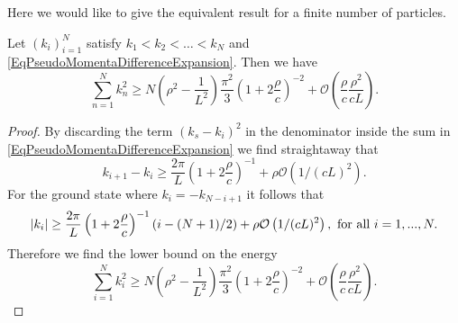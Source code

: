 Here we would like to give the equivalent result for a finite number of particles.
\begin{lemma}
	Let $ (k_i)_{i=1}^{N} $ satisfy $ k_1<k_2<\ldots<k_N $ and \eqref{EqPseudoMomentaDifferenceExpansion}. Then we have 
	\begin{equation}
	\sum_{n=1}^{N}k_n^2\geq N\left(\rho^2-\frac{1}{L^2}\right)\frac{\pi^2}{3}\left(1+2\frac{\rho}{c}\right)^{-2}+\mathcal{O}\left(\frac{\rho}{c}\frac{\rho^2}{cL} \right).
	\end{equation}
\end{lemma}
\begin{proof}
	By discarding the term $ (k_s-k_i)^2 $ in the denominator inside the sum in \eqref{EqPseudoMomentaDifferenceExpansion} we find straightaway that
	$$k_{i+1}-k_i\geq \frac{2\pi}{L}\left(1+2\frac{\rho}{c}\right)^{-1}+\rho \mathcal{O}\left(1/(cL)^2\right). $$
For the ground state where $k_i=-k_{N-i+1}$ it follows that \begin{equation}
	\left\lvert k_i \right\rvert\geq \frac{2\pi}{L}\left(1+2\frac{\rho}{c}\right)^{-1}(i-(N+1)/2)+\rho \mathcal{O}\left(1/(cL)^2\right), \text{ for all } i=1,...,N.
\end{equation} 
Therefore we find the lower bound on the energy \begin{equation}
	\sum_{i=1}^{N}k_i^2\geq N\left(\rho^2-\frac{1}{L^2}\right)\frac{\pi^2}{3}\left(1+2\frac{\rho}{c}\right)^{-2}+\mathcal{O}\left(\frac{\rho}{c}\frac{\rho^2}{cL} \right).
\end{equation}
\end{proof}

